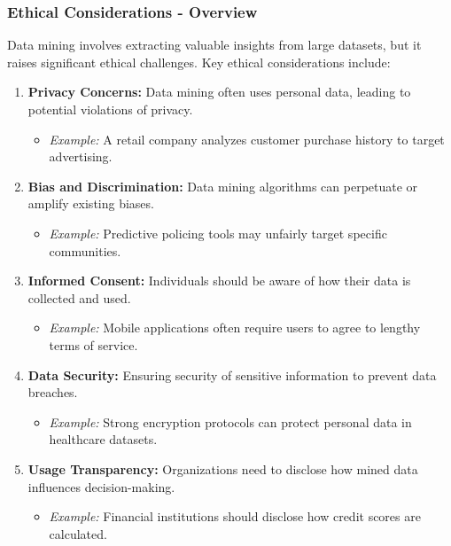 \documentclass{beamer}
\begin{document}
\begin{frame}[fragile]
    \frametitle{Ethical Considerations - Overview}
    Data mining involves extracting valuable insights from large datasets, but it raises significant ethical challenges. Key ethical considerations include:
    
    \begin{enumerate}
        \item \textbf{Privacy Concerns:} 
        Data mining often uses personal data, leading to potential violations of privacy.
        \begin{itemize}
            \item \textit{Example:} A retail company analyzes customer purchase history to target advertising.
        \end{itemize}

        \item \textbf{Bias and Discrimination:} 
        Data mining algorithms can perpetuate or amplify existing biases.
        \begin{itemize}
            \item \textit{Example:} Predictive policing tools may unfairly target specific communities.
        \end{itemize}

        \item \textbf{Informed Consent:} 
        Individuals should be aware of how their data is collected and used.
        \begin{itemize}
            \item \textit{Example:} Mobile applications often require users to agree to lengthy terms of service.
        \end{itemize}

        \item \textbf{Data Security:} 
        Ensuring security of sensitive information to prevent data breaches.
        \begin{itemize}
            \item \textit{Example:} Strong encryption protocols can protect personal data in healthcare datasets.
        \end{itemize}

        \item \textbf{Usage Transparency:} 
        Organizations need to disclose how mined data influences decision-making.
        \begin{itemize}
            \item \textit{Example:} Financial institutions should disclose how credit scores are calculated.
        \end{itemize}
    \end{enumerate}
\end{frame}
\end{document}
